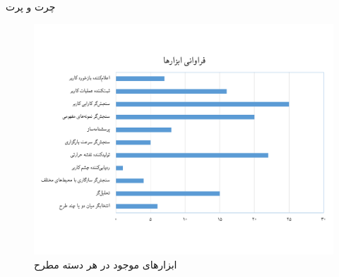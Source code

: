 چرت و پرت
\begin{figure}[H]
	\centering\includegraphics[width=0.8\linewidth]{Resources/tools_category.pdf}
	\caption[ابزارهای موجود در هر دسته مطرح]
	{ابزارهای موجود در هر دسته مطرح
	}
	\label{fig:category_tools}
\end{figure}
